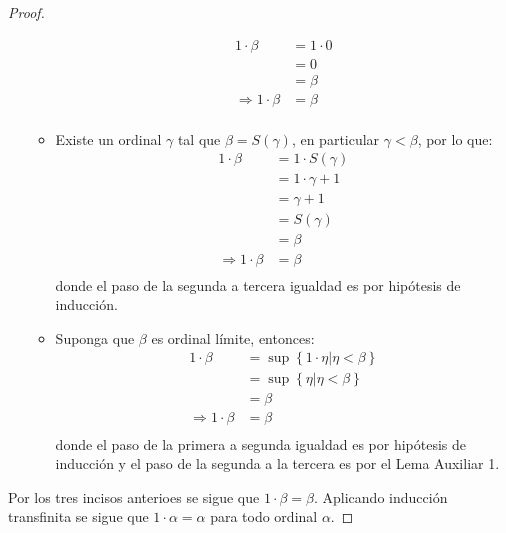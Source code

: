 \documentclass[12pt]{article}
\newcounter{it}
\theoremstyle{largebreak}
\begin{document}
\begin{proof}
\begin{itemize}
\begin{itemize}
\begin{equation*}
                    \begin{split}
                        1\cdot\beta&=1\cdot0\\
                        &=0\\
                        &=\beta\\
                        \Rightarrow 1\cdot\beta&=\beta\\
                    \end{split}
                \end{equation*}
                \item Existe un ordinal $\gamma$ tal que $\beta=S(\gamma)$, en particular $\gamma<\beta$, por lo que:
                \begin{equation*}
                    \begin{split}
                        1\cdot\beta&=1\cdot S(\gamma)\\
                        &=1\cdot\gamma+1\\
                        &=\gamma+1\\
                        &=S(\gamma)\\
                        &=\beta\\
                        \Rightarrow 1\cdot\beta&=\beta\\
                    \end{split}
                \end{equation*}
                donde el paso de la segunda a tercera igualdad es por hipótesis de inducción.
                \item Suponga que $\beta$ es ordinal límite, entonces:
                \begin{equation*}
                    \begin{split}
                        1\cdot\beta&=\sup\left\{1\cdot\eta\Big|\eta<\beta \right\}\\
                        &=\sup\left\{\eta\Big|\eta<\beta \right\}\\
                        &=\beta\\
                        \Rightarrow 1\cdot\beta&=\beta\\
                    \end{split}
                \end{equation*}
                donde el paso de la primera a segunda igualdad es por hipótesis de inducción y el paso de la segunda a la tercera es por el Lema Auxiliar 1.
            \end{itemize}
        \end{itemize}
        Por los tres incisos anterioes se sigue que $1\cdot\beta=\beta$. Aplicando inducción transfinita se sigue que $1\cdot\alpha=\alpha$ para todo ordinal $\alpha$.
    \end{proof}
\end{document}
